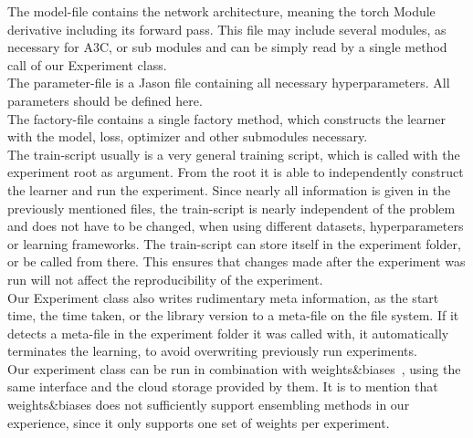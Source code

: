 \documentclass[11pt,a4paper]{article}
\begin{document}
	The model-file contains the network architecture, meaning the torch Module derivative including its forward pass.
	This file may include several modules, as necessary for A3C, or sub modules and can be simply read by a single method call of our Experiment class.\\
	The parameter-file is a Jason file containing all necessary hyperparameters.
	All parameters should be defined here.\\
	The factory-file contains a single factory method, which constructs the learner with the model, loss, optimizer and other submodules necessary.\\
	The train-script usually is a very general training script, which is called with the experiment root as argument.
	From the root it is able to independently construct the learner and run the experiment.
	Since nearly all information is given in the previously mentioned files, the train-script is nearly independent of the problem and does not have to be changed, when using different datasets, hyperparameters or learning frameworks.
	The train-script can store itself in the experiment folder, or be called from there.
	This ensures that changes made after the experiment was run will not affect the reproducibility of the experiment.\\

	Our Experiment class also writes rudimentary meta information, as the start time, the time taken, or the library version to a meta-file on the file system.
	If it detects a meta-file in the experiment folder it was called with, it automatically terminates the learning, to avoid overwriting previously run experiments.\\

	Our experiment class can be run in combination with weights\&biases~\cite{noauthor_weights_nodate}, using the same interface and the cloud storage provided by them.
	It is to mention that weights\&biases does not sufficiently support ensembling methods in our experience, since it only supports one set of weights per experiment.
\end{document}
